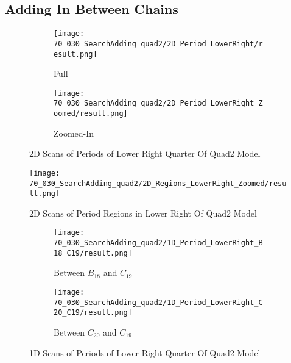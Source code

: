 \subsection{Adding In Between Chains}

\begin{figure}
    \centering
    \begin{subfigure}{0.4\textwidth}
        \centering
        \texttt{[image: 70\_030\_SearchAdding\_quad2/2D\_Period\_LowerRight/result.png]}
        \caption{Full}
    \end{subfigure}
    \begin{subfigure}{0.4\textwidth}
        \centering
        \texttt{[image: 70\_030\_SearchAdding\_quad2/2D\_Period\_LowerRight\_Zoomed/result.png]}
        \caption{Zoomed-In}
    \end{subfigure}
    \caption{2D Scans of Periods of Lower Right Quarter Of Quad2 Model}
\end{figure}

\begin{figure}
    \centering
    \texttt{[image: 70\_030\_SearchAdding\_quad2/2D\_Regions\_LowerRight\_Zoomed/result.png]}
    \caption{2D Scans of Period Regions in Lower Right Of Quad2 Model}
\end{figure}

\begin{figure}
    \centering
    \begin{subfigure}{0.4\textwidth}
        \centering
        \texttt{[image: 70\_030\_SearchAdding\_quad2/1D\_Period\_LowerRight\_B18\_C19/result.png]}
        \caption{Between $B_{18}$ and $C_{19}$}
    \end{subfigure}
    \begin{subfigure}{0.4\textwidth}
        \centering
        \texttt{[image: 70\_030\_SearchAdding\_quad2/1D\_Period\_LowerRight\_C20\_C19/result.png]}
        \caption{Between $C_{20}$ and $C_{19}$}
    \end{subfigure}
    \caption{1D Scans of Periods of Lower Right Quarter Of Quad2 Model}
\end{figure}

